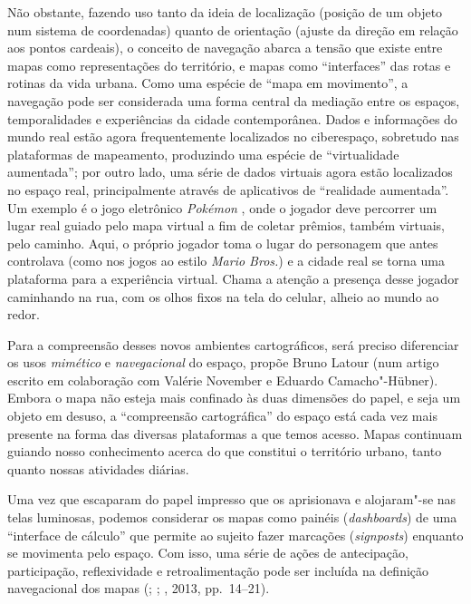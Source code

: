 Não obstante, fazendo uso tanto da ideia de localização (posição de um objeto num sistema de coordenadas) quanto de orientação (ajuste da direção em relação aos pontos cardeais), o conceito de navegação abarca a tensão que existe
entre mapas como representações do território, e mapas como
``interfaces'' das rotas e rotinas da vida urbana. Como uma espécie de ``mapa em movimento'', a navegação pode ser
considerada uma forma central da mediação entre os espaços,
temporalidades e experiências da cidade contemporânea. Dados e informações do mundo
real estão agora frequentemente localizados no ciberespaço, sobretudo
nas plataformas de mapeamento, produzindo uma espécie de ``virtualidade
aumentada''; por outro lado, uma série de dados virtuais agora estão
localizados no espaço real, principalmente através de aplicativos de
``realidade aumentada''. Um exemplo é o jogo eletrônico \emph{Pokémon}
, onde o jogador deve percorrer um lugar real guiado pelo mapa
virtual a fim de coletar prêmios, também virtuais, pelo caminho. Aqui, o
próprio jogador toma o lugar do personagem que antes controlava (como
nos jogos ao estilo \emph{Mario Bros.}) e a cidade real se torna uma
plataforma para a experiência virtual. Chama a atenção a presença desse
jogador caminhando na rua, com os olhos fixos na tela do celular, alheio
ao mundo ao redor.

Para a compreensão desses novos ambientes cartográficos, será preciso
diferenciar os usos \emph{mimético} e \emph{navegacional} do espaço,
propõe Bruno Latour (num artigo escrito em colaboração com Valérie
November e Eduardo Camacho"-Hübner). Embora o mapa não esteja mais
confinado às duas dimensões do papel, e seja um objeto em desuso, a
``compreensão cartográfica'' do espaço está cada vez mais presente na
forma das diversas plataformas a que temos acesso. Mapas continuam
guiando nosso conhecimento acerca do que constitui o território urbano,
tanto quanto nossas atividades diárias.

Uma vez que escaparam do papel impresso que os aprisionava e alojaram"-se
nas telas luminosas, podemos considerar os mapas como painéis
(\emph{dashboards}) de uma ``interface de cálculo'' que permite ao
sujeito fazer marcações (\emph{signposts}) enquanto se movimenta pelo
espaço. Com isso, uma série de ações de antecipação, participação,
reflexividade e retroalimentação pode ser incluída na definição
navegacional dos mapas (; ; , 2013, pp.~14--21).

